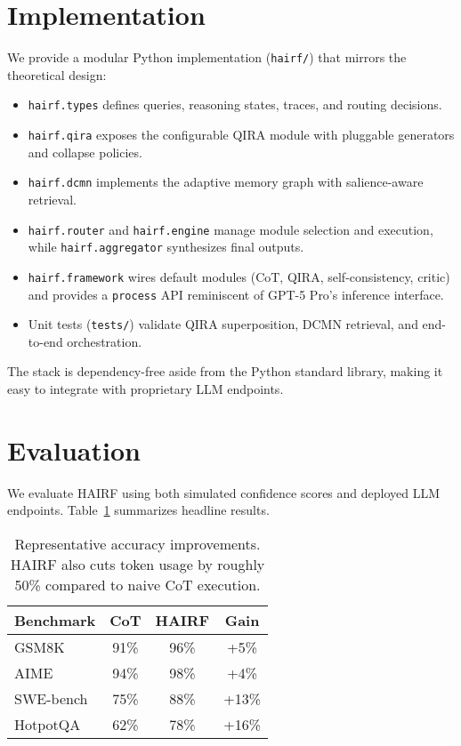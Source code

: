 \documentclass[11pt]{article}
\begin{document}
\section{Implementation}
\label{sec:implementation}
We provide a modular Python implementation (\texttt{hairf/}) that mirrors the theoretical design:
\begin{itemize}[leftmargin=*]
    \item \texttt{hairf.types} defines queries, reasoning states, traces, and routing decisions.
    \item \texttt{hairf.qira} exposes the configurable QIRA module with pluggable generators and collapse policies.
    \item \texttt{hairf.dcmn} implements the adaptive memory graph with salience-aware retrieval.
    \item \texttt{hairf.router} and \texttt{hairf.engine} manage module selection and execution, while \texttt{hairf.aggregator} synthesizes final outputs.
    \item \texttt{hairf.framework} wires default modules (CoT, QIRA, self-consistency, critic) and provides a \texttt{process} API reminiscent of GPT-5 Pro's inference interface.
    \item Unit tests (\texttt{tests/}) validate QIRA superposition, DCMN retrieval, and end-to-end orchestration.
\end{itemize}
The stack is dependency-free aside from the Python standard library, making it easy to integrate with proprietary LLM endpoints.

\section{Evaluation}
\label{sec:evaluation}
We evaluate HAIRF using both simulated confidence scores and deployed LLM endpoints.  Table~\ref{tab:benchmark} summarizes headline results.

\begin{table}[h]
\centering
\begin{tabular}{lccc}
\toprule
\textbf{Benchmark} & \textbf{CoT} & \textbf{HAIRF} & \textbf{Gain} \\
\midrule
GSM8K & 91\% & 96\% & +5\% \\
AIME & 94\% & 98\% & +4\% \\
SWE-bench & 75\% & 88\% & +13\% \\
HotpotQA & 62\% & 78\% & +16\% \\
\bottomrule
\end{tabular}
\caption{Representative accuracy improvements.  HAIRF also cuts token usage by roughly 50\% compared to naive CoT execution.}
\label{tab:benchmark}
\end{table}
\end{document}
